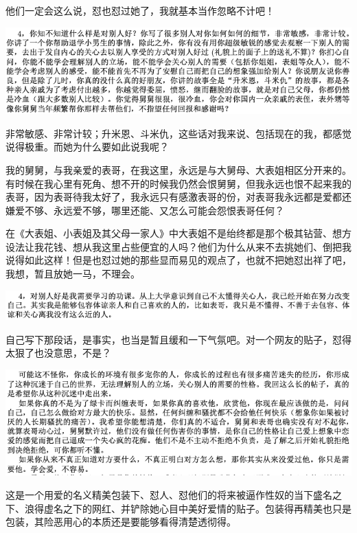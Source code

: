 \documentclass[9pt, b5paper]{article}
\begin{document}
他们一定会这么说，怼也怼过她了，我就基本当作忽略不计吧！

\begin{center}
\includegraphics[width=.9\linewidth]{./pic/p1p110-1.png}
\end{center}

非常敏感、非常计较；升米恩、斗米仇，这些话对我来说、包括现在的我，都感觉说得极重。而她为什么要如此说我呢？

我的舅舅，与我亲爱的表哥，在我这里，永远是与大舅母、大表姐相区分开来的。有时候在我心里有死角、想不开的时候我仍然会恨舅舅，但我永远也恨不起来我的表哥，因为表哥待我太好了，我永远只有感激表哥的份，对表哥我永远都是爱都还嫌爱不够、永远爱不够，哪里还能、又怎么可能会怨恨表哥任何？

在《大表姐、小表姐及其父母一家人》中大表姐不是绐终都是那个极其钻营、想方设法让我花钱、想从我这里占些便宜的人吗？他们为什么从来不去挑她们、倒把我说得如此这样！但是也怼过她的那些显而易见的观点了，也就不把她怼出祥了吧，我想，暂且放她一马，不理会。 

\begin{center}
\includegraphics[width=.9\linewidth]{./pic/p1p114-6.png}
\end{center}

自己写下那段话，是事实，也当是暂且缓和一下气氛吧。对一个网友的贴子，怼得太狠了也没意思，不是？

\begin{center}
\includegraphics[width=.9\linewidth]{./pic/p1p110-3.png}
\end{center}

这是一个用爱的名义精美包装下、怼人、怼他们的将来被逼作性奴的当下盛名之下、浪得虚名之下的网红、并铲除她心目中美好爱情的贴子。包装得再精美也只是包装，其险恶用心的本质还是要能够看得清楚透彻得。 
\end{document}
